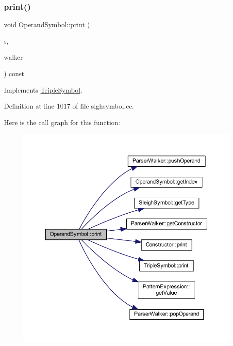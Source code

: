 \subsubsection{\texorpdfstring{print()}{print()}}
{\footnotesize\ttfamily void Operand\+Symbol\+::print (\begin{DoxyParamCaption}\item[{ostream \&}]{s,  }\item[{\mbox{\hyperlink{class_parser_walker}{Parser\+Walker}} \&}]{walker }\end{DoxyParamCaption}) const\hspace{0.3cm}{\ttfamily [virtual]}}



Implements \mbox{\hyperlink{class_triple_symbol_a205c4487d3ad54532097dd77eb4501fc}{Triple\+Symbol}}.



Definition at line 1017 of file slghsymbol.\+cc.

Here is the call graph for this function\+:
\nopagebreak
\begin{figure}[H]
\begin{center}
\leavevmode
\includegraphics[width=350pt]{class_operand_symbol_a6aae865579741ebe784ba0782c0192ec_cgraph}
\end{center}
\end{figure}
\mbox{\label{class_operand_symbol_a89eb88d3d81b27fae7432adf31d2d27a}} 
